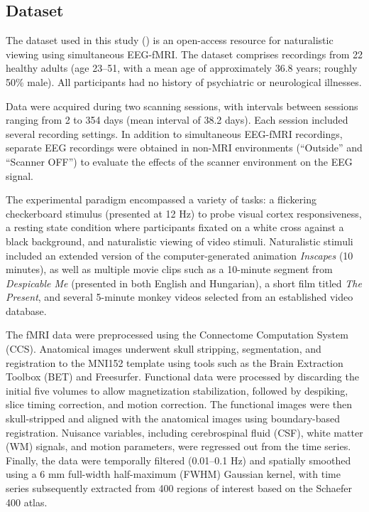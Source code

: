 \documentclass[stu,12pt,floatsintext]{apa7}
\begin{document}
\subsection{Dataset}
The dataset used in this study (\cite{telesford_open-access_2023}) is an open-access resource for naturalistic viewing using simultaneous EEG-fMRI. The dataset comprises recordings from 22 healthy adults (age 23–51, with a mean age of approximately 36.8 years; roughly 50\% male). All participants had no history of psychiatric or neurological illnesses.

Data were acquired during two scanning sessions, with intervals between sessions ranging from 2 to 354 days (mean interval of 38.2 days). Each session included several recording settings. In addition to simultaneous EEG-fMRI recordings, separate EEG recordings were obtained in non-MRI environments (``Outside'' and ``Scanner OFF'') to evaluate the effects of the scanner environment on the EEG signal. 

The experimental paradigm encompassed a variety of tasks: a flickering checkerboard stimulus (presented at 12 Hz) to probe visual cortex responsiveness, a resting state condition where participants fixated on a white cross against a black background, and naturalistic viewing of video stimuli. Naturalistic stimuli included an extended version of the computer-generated animation \textit{Inscapes} (10 minutes), as well as multiple movie clips such as a 10-minute segment from \textit{Despicable Me} (presented in both English and Hungarian), a short film titled \textit{The Present}, and several 5-minute monkey videos selected from an established video database.

The fMRI data were preprocessed using the Connectome Computation System (CCS). Anatomical images underwent skull stripping, segmentation, and registration to the MNI152 template using tools such as the Brain Extraction Toolbox (BET) and Freesurfer. Functional data were processed by discarding the initial five volumes to allow magnetization stabilization, followed by despiking, slice timing correction, and motion correction. The functional images were then skull-stripped and aligned with the anatomical images using boundary-based registration. Nuisance variables, including cerebrospinal fluid (CSF), white matter (WM) signals, and motion parameters, were regressed out from the time series. Finally, the data were temporally filtered (0.01–0.1 Hz) and spatially smoothed using a 6 mm full-width half-maximum (FWHM) Gaussian kernel, with time series subsequently extracted from 400 regions of interest based on the Schaefer 400 atlas.
\end{document}
